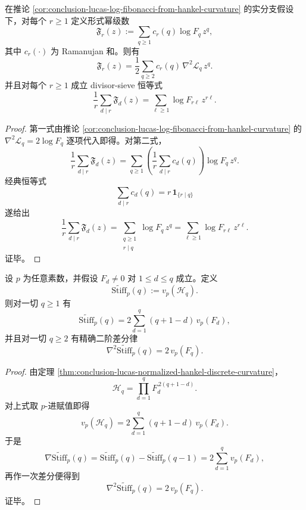 \begin{theorem}\label{thm:conclusion-lucas-hankel-curvature-ramanujan-tomography}
在推论 \ref{cor:conclusion-lucas-log-fibonacci-from-hankel-curvature} 的实分支假设下，对每个 \(r\ge 1\) 定义形式幂级数
\[
\mathfrak F_r(z):=\sum_{q\ge 1}c_r(q)\log F_q\,z^q,
\]
其中 \(c_r(\cdot)\) 为 Ramanujan 和。则有
\[
\mathfrak F_r(z)
=
\frac12\sum_{q\ge 2}c_r(q)\,\nabla^2\mathcal L_q\,z^q.
\]
并且对每个 \(r\ge 1\) 成立 divisor-sieve 恒等式
\[
\frac1r\sum_{d\mid r}\mathfrak F_d(z)
=
\sum_{\ell\ge 1}\log F_{r\ell}\,z^{r\ell}.
\]
\end{theorem}
\begin{proof}
第一式由推论 \ref{cor:conclusion-lucas-log-fibonacci-from-hankel-curvature} 的
\(
\nabla^2\mathcal L_q=2\log F_q
\)
逐项代入即得。对第二式，
\[
\frac1r\sum_{d\mid r}\mathfrak F_d(z)
=
\sum_{q\ge 1}
\left(\frac1r\sum_{d\mid r}c_d(q)\right)\log F_q\,z^q.
\]
经典恒等式
\[
\sum_{d\mid r}c_d(q)=r\,\mathbf 1_{\{r\mid q\}}
\]
遂给出
\[
\frac1r\sum_{d\mid r}\mathfrak F_d(z)
=
\sum_{\substack{q\ge 1\\ r\mid q}}\log F_q\,z^q
=
\sum_{\ell\ge 1}\log F_{r\ell}\,z^{r\ell}.
\]
证毕。
\end{proof}

\begin{theorem}\label{thm:conclusion-lucas-normalized-stiffness-newton-potential}
设 \(p\) 为任意素数，并假设 \(F_d\neq 0\) 对 \(1\le d\le q\) 成立。定义
\[
\widetilde{\mathrm{Stiff}}_p(q):=v_p(\mathcal H_q).
\]
则对一切 \(q\ge 1\) 有
\[
\widetilde{\mathrm{Stiff}}_p(q)
=
2\sum_{d=1}^{q}(q+1-d)\,v_p(F_d),
\]
并且对一切 \(q\ge 2\) 有精确二阶差分律
\[
\nabla^2\widetilde{\mathrm{Stiff}}_p(q)=2\,v_p(F_q).
\]
\end{theorem}
\begin{proof}
由定理 \ref{thm:conclusion-lucas-normalized-hankel-discrete-curvature}，
\[
\mathcal H_q=\prod_{d=1}^{q}F_d^{\,2(q+1-d)}.
\]
对上式取 \(p\)-进赋值即得
\[
v_p(\mathcal H_q)
=
2\sum_{d=1}^{q}(q+1-d)\,v_p(F_d).
\]
于是
\[
\nabla \widetilde{\mathrm{Stiff}}_p(q)
=
\widetilde{\mathrm{Stiff}}_p(q)-\widetilde{\mathrm{Stiff}}_p(q-1)
=
2\sum_{d=1}^{q}v_p(F_d),
\]
再作一次差分便得到
\[
\nabla^2\widetilde{\mathrm{Stiff}}_p(q)=2\,v_p(F_q).
\]
证毕。
\end{proof}

